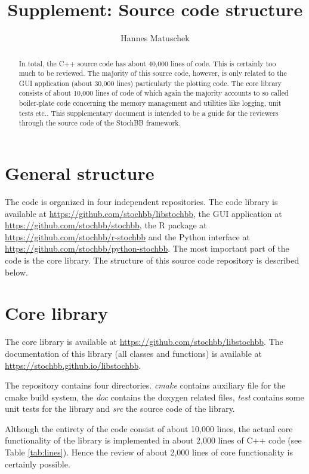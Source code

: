 \documentclass[a4paper, 10pt]{article}
\title{Supplement: Source code structure}
\author{Hannes Matuschek}
\begin{document}
\maketitle

\begin{abstract}
In total, the C++ source code has about 40,000 lines of code. This is certainly too much to be reviewed. The majority of this source code, however, is only related to the GUI application (about 30,000 lines) particularly  the plotting code. The core library consists of about 10,000 lines of code of which again the majority accounts to so called boiler-plate code concerning the memory management and utilities like logging, unit tests etc.. This supplementary document is intended to be a guide for the reviewers through the source code of the StochBB framework.
\end{abstract}

\section{General structure}
The code is organized in four independent repositories. The code library is available at \href{https://github.com/stochbb/libstochbb}{https://github.com/stochbb/libstochbb}, the GUI application at \href{https://github.com/stochbb/stochbb}{https://github.com/stochbb/stochbb}, the R package at \href{https://github.com/stochbb/r-stochbb}{https://github.com/stochbb/r-stochbb} and the Python interface at \href{https://github.com/stochbb/python-stochbb}{https://github.com/stochbb/python-stochbb}. The most important part of the code is the core library. The structure of this source code repository is described below.

\section{Core library}
The core library is available at \href{https://github.com/stochbb/libstochbb}{https://github.com/stochbb/libstochbb}. The documentation of this library (all classes and functions) is available at \href{https://stochbb.github.io/libstochbb}{https://stochbb.github.io/libstochbb}.

The repository contains four directories. \emph{cmake} contains auxiliary file for the cmake build system, the \emph{doc} contains the doxygen related files, \emph{test} contains some unit tests for the library and \emph{src} the source code of the library. 

Although the entirety of the code consist of about 10,000 lines, the actual core functionality of the library is implemented in about 2,000 lines of C++ code (see Table \ref{tab:lines}). Hence the review of about 2,000 lines of core functionality is certainly possible.
\end{document}
